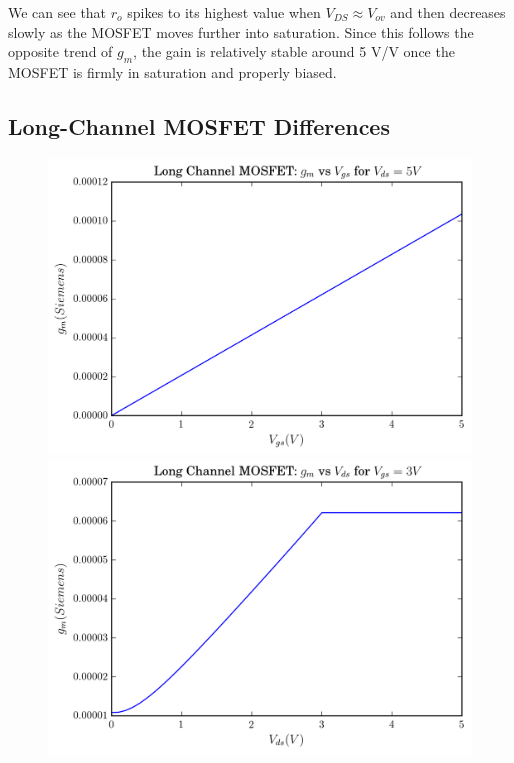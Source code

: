 \documentclass[11pt]{article}
\begin{document}
We can see that $r_o$ spikes to its highest value when $V_{DS} \approx V_{ov}$ and then decreases slowly as the MOSFET moves further into saturation. Since this follows the opposite trend of $g_m$, the gain is relatively stable around 5 V/V once the MOSFET is firmly in saturation and properly biased.

\subsection{Long-Channel MOSFET Differences}
\begin{figure}[H]
	\includegraphics[width=\linewidth]{images/long_channel_gm_vs_vgs.png}
	\endminipage\hfill
	\includegraphics[width=\linewidth]{images/long_channel_gm_vs_vds.png}
	\endminipage
\end{figure}
\end{document}
